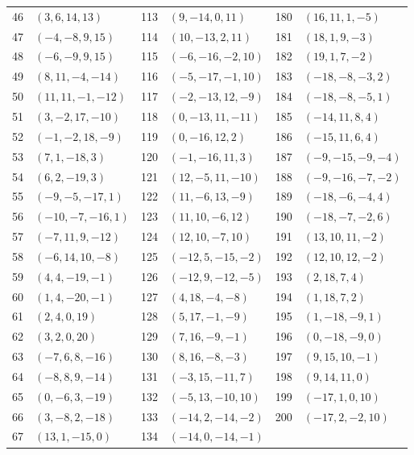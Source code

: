{\begin{longtable}{rlrlrl}
46 & $(3,6,14,13)$ & 113 & $(9,-14,0,11)$ & 180 & $(16,11,1,-5)$\\
47 & $(-4,-8,9,15)$ & 114 & $(10,-13,2,11)$ & 181 & $(18,1,9,-3)$\\
48 & $(-6,-9,9,15)$ & 115 & $(-6,-16,-2,10)$ & 182 & $(19,1,7,-2)$\\
49 & $(8,11,-4,-14)$ & 116 & $(-5,-17,-1,10)$ & 183 & $(-18,-8,-3,2)$\\
50 & $(11,11,-1,-12)$ & 117 & $(-2,-13,12,-9)$ & 184 & $(-18,-8,-5,1)$\\
51 & $(3,-2,17,-10)$ & 118 & $(0,-13,11,-11)$ & 185 & $(-14,11,8,4)$\\
52 & $(-1,-2,18,-9)$ & 119 & $(0,-16,12,2)$ & 186 & $(-15,11,6,4)$\\
53 & $(7,1,-18,3)$ & 120 & $(-1,-16,11,3)$ & 187 & $(-9,-15,-9,-4)$\\
54 & $(6,2,-19,3)$ & 121 & $(12,-5,11,-10)$ & 188 & $(-9,-16,-7,-2)$\\
55 & $(-9,-5,-17,1)$ & 122 & $(11,-6,13,-9)$ & 189 & $(-18,-6,-4,4)$\\
56 & $(-10,-7,-16,1)$ & 123 & $(11,10,-6,12)$ & 190 & $(-18,-7,-2,6)$\\
57 & $(-7,11,9,-12)$ & 124 & $(12,10,-7,10)$ & 191 & $(13,10,11,-2)$\\
58 & $(-6,14,10,-8)$ & 125 & $(-12,5,-15,-2)$ & 192 & $(12,10,12,-2)$\\
59 & $(4,4,-19,-1)$ & 126 & $(-12,9,-12,-5)$ & 193 & $(2,18,7,4)$\\
60 & $(1,4,-20,-1)$ & 127 & $(4,18,-4,-8)$ & 194 & $(1,18,7,2)$\\
61 & $(2,4,0,19)$ & 128 & $(5,17,-1,-9)$ & 195 & $(1,-18,-9,1)$\\
62 & $(3,2,0,20)$ & 129 & $(7,16,-9,-1)$ & 196 & $(0,-18,-9,0)$\\
63 & $(-7,6,8,-16)$ & 130 & $(8,16,-8,-3)$ & 197 & $(9,15,10,-1)$\\
64 & $(-8,8,9,-14)$ & 131 & $(-3,15,-11,7)$ & 198 & $(9,14,11,0)$\\
65 & $(0,-6,3,-19)$ & 132 & $(-5,13,-10,10)$ & 199 & $(-17,1,0,10)$\\
66 & $(3,-8,2,-18)$ & 133 & $(-14,2,-14,-2)$ & 200 & $(-17,2,-2,10)$\\
67 & $(13,1,-15,0)$ & 134 & $(-14,0,-14,-1)$ &  & \\
\end{longtable}
}
